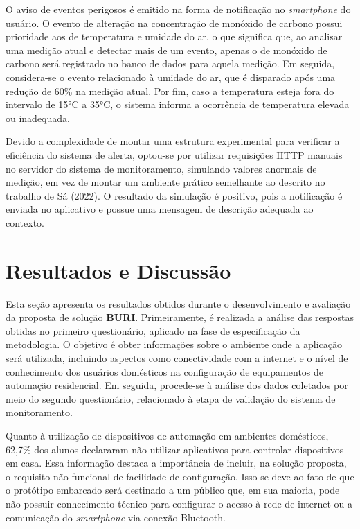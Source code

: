 \documentclass[alpha-refs,brazilian]{RBCA_v3.0}
\begin{document}
O aviso de eventos perigosos é emitido na forma de notificação no \textit{smartphone} do usuário. O evento de alteração na concentração de monóxido de carbono possui prioridade aos de temperatura e umidade do ar, o que significa que, ao analisar uma medição atual e detectar 
mais de um evento, apenas o de monóxido de carbono será registrado no banco de dados para aquela medição. Em seguida, considera-se o evento relacionado à umidade do ar, que é disparado após 
uma redução de 60\% na medição atual. Por fim, caso a temperatura esteja fora do intervalo de 15°C a 35°C, o sistema informa a ocorrência de temperatura elevada ou inadequada.

Devido a complexidade de montar uma estrutura experimental para verificar a eficiência do sistema de alerta, optou-se por utilizar requisições HTTP manuais no servidor do sistema de 
monitoramento, simulando valores anormais de medição, em vez de montar um ambiente prático semelhante ao descrito no trabalho de Sá (2022). O resultado 
da simulação é positivo, pois a notificação é enviada no aplicativo e possue uma mensagem de descrição adequada ao contexto.

\section{Resultados e Discussão}\label{sec06:resultados}

Esta seção apresenta os resultados obtidos durante o desenvolvimento e avaliação da proposta de solução \textbf{BURI}. Primeiramente, é realizada a análise das respostas obtidas no primeiro 
questionário, aplicado na fase de especificação da metodologia. O objetivo é obter informações sobre o ambiente onde a aplicação será utilizada, incluindo aspectos como conectividade com a 
internet e o nível de conhecimento dos usuários domésticos na configuração de equipamentos de automação residencial. Em seguida, procede-se à análise dos dados coletados por meio do segundo 
questionário, relacionado à etapa de validação do sistema de monitoramento.

Quanto à utilização de dispositivos de automação em ambientes domésticos, 62,7\% dos alunos declararam não utilizar aplicativos para controlar dispositivos em casa. Essa informação destaca a 
importância de incluir, na solução proposta, o requisito não funcional de facilidade de configuração. Isso se deve ao fato de que o protótipo embarcado será destinado a um público que, em sua maioria, 
pode não possuir conhecimento técnico para configurar o acesso à rede de internet ou a comunicação do \textit{smartphone} via conexão Bluetooth.  
\end{document}
